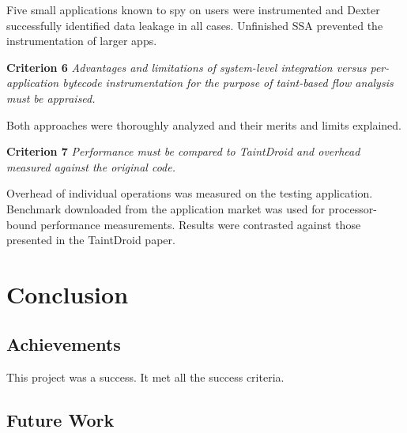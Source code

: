 \documentclass[12pt,twoside,notitlepage]{report}
\begin{document}
\begin{description}
	Five small applications known to spy on users were instrumented and Dexter successfully identified data leakage in all cases. Unfinished SSA prevented the instrumentation of larger apps.
      
	\item \textbf{Criterion 6} \emph{Advantages and limitations of system-level integration versus per-application bytecode instrumentation for the purpose of taint-based flow analysis must be appraised.}

	Both approaches were thoroughly analyzed and their merits and limits explained.

	\item \textbf{Criterion 7} \emph{Performance must be compared to TaintDroid and overhead measured against the original code.}

	Overhead of individual operations was measured on the testing application. Benchmark downloaded from the application market was used for processor-bound performance measurements. Results were contrasted against those presented in the TaintDroid paper.
\end{description}

\cleardoublepage
\chapter{Conclusion}

\section{Achievements}

This project was a success. It met all the success criteria.

\section{Future Work}
\end{document}
